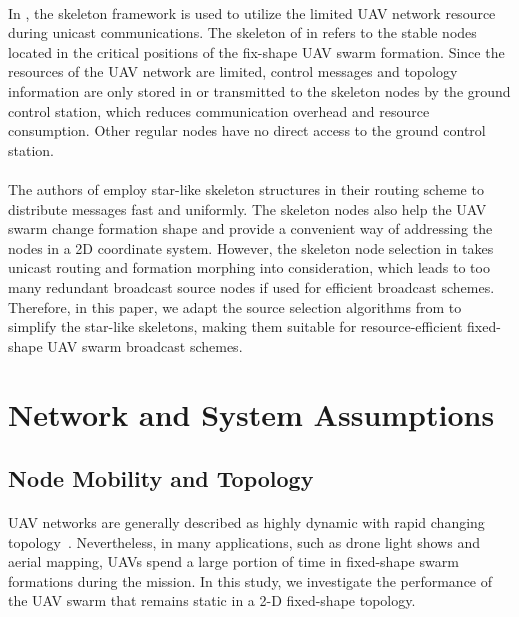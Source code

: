 \documentclass[a4paper,12pt]{report}
\begin{document}
\paragraph{}
In \cite{ssr}, the skeleton framework is used to utilize the limited UAV network resource during unicast communications. The skeleton of in \cite{ssr} refers to the stable nodes located in the critical positions of the fix-shape UAV swarm formation. Since the resources of the UAV network are limited, control messages and topology information are only stored in or transmitted to the skeleton nodes by the ground control station, which reduces communication overhead and resource consumption. Other regular nodes have no direct access to the ground control station.

\paragraph{}
The authors of \cite{ssr} employ star-like skeleton structures in their routing scheme to distribute messages fast and uniformly. The skeleton nodes also help the UAV swarm change formation shape and provide a convenient way of addressing the nodes in a 2D coordinate system. However, the skeleton node selection in \cite{ssr} takes unicast routing and formation morphing into consideration, which leads to too many redundant broadcast source nodes if used for efficient broadcast schemes. Therefore, in this paper, we adapt the source selection algorithms from \cite{prose} to simplify the star-like skeletons, making them suitable for resource-efficient fixed-shape UAV swarm broadcast schemes.

\section{Network and System Assumptions}

\subsection{Node Mobility and Topology}
\paragraph{}
UAV networks are generally described as highly dynamic with rapid changing topology~\cite{ssr}. Nevertheless, in many applications, such as drone light shows and aerial mapping, UAVs spend a large portion of time in fixed-shape swarm formations during the mission. In this study, we investigate the performance of the UAV swarm that remains static in a 2-D fixed-shape topology.
\end{document}
